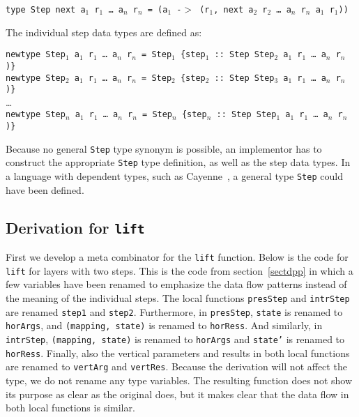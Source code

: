 \begin{tabbing}
{\tt type St}\={\tt ep next a$_1$ r$_1$ \dots ~a$_n$ r$_n$ = (a$_1$ -$>$  (r$_1$, next a$_2$ r$_2$ \dots ~a$_n$ r$_n$ a$_1$ r$_1$)) }
\end{tabbing}

The individual step data types are defined as:

{\tt newtype Step$_1$ a$_1$ r$_1$ \dots ~a$_n$ r$_n$ = Step$_1$ \{step$_1$}\verb| :: |{\tt Step Step$_2$ a$_1$ r$_1$ \dots ~a$_n$ r$_n$ )\}}\\
{\tt newtype Step$_2$ a$_1$ r$_1$ \dots ~a$_n$ r$_n$ = Step$_2$ \{step$_2$}\verb| :: |{\tt Step Step$_3$ a$_1$ r$_1$ \dots ~a$_n$ r$_n$ )\}}\\
\dots\\
{\tt newtype Step$_n$ a$_1$ r$_1$ \dots ~a$_n$ r$_n$ = Step$_n$ \{step$_n$}\verb| :: |{\tt Step Step$_1$ a$_1$ r$_1$ \dots ~a$_n$ r$_n$ )\}}

Because no general \texttt{Step} type synonym is possible, an implementor has to construct the appropriate \texttt{Step} type definition, as well as the step data types. In a language with dependent types, such as Cayenne~\cite{augustsson98cayenne}, a general type \texttt{Step} could have been defined.


%																
\subsection{Derivation for \texttt{lift}}

First we develop a meta combinator for the \texttt{lift} function. Below is the code for \texttt{lift} for layers with two steps. This is the code from section~\ref{sectdpp} in which a few variables have been renamed to emphasize the data flow patterns instead of the meaning of the individual steps. The local functions \texttt{presStep} and \texttt{intrStep} are renamed \texttt{step1} and \texttt{step2}. Furthermore, in \texttt{presStep}, \texttt{state} is renamed to \texttt{horArgs}, and \texttt{(mapping, state)} is renamed to \texttt{horRess}. And similarly, in \texttt{intrStep}, \texttt{(mapping, state)} is renamed to \texttt{horArgs} and \texttt{state'} is renamed to \texttt{horRess}. Finally, also the vertical parameters and results in both local functions are renamed to \texttt{vertArg} and \texttt{vertRes}. Because the derivation will not affect the type, we do not rename any type variables. The resulting function does not show its purpose as clear as the original does, but it makes clear that the data flow in both local functions is similar.


